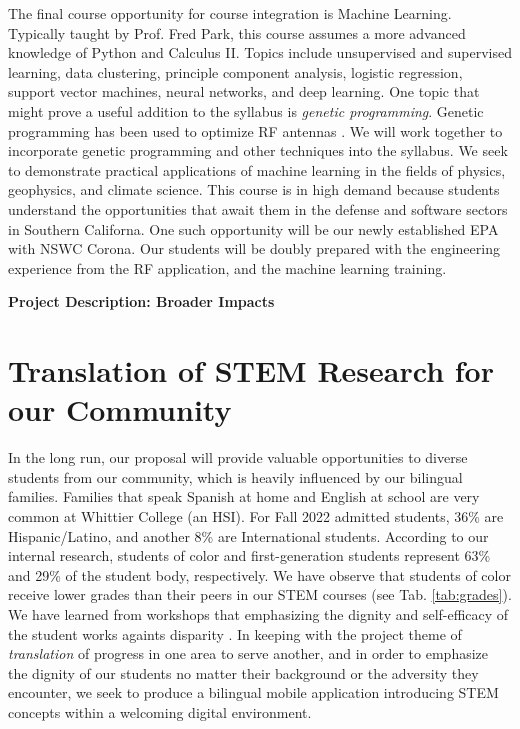 \documentclass[10pt]{amsart}
\theoremstyle{definition}
\numberwithin{equation}{section}
\begin{document}
The final course opportunity for course integration is Machine Learning.  Typically taught by Prof. Fred Park, this course assumes a more advanced knowledge of Python and Calculus II.  Topics include unsupervised and supervised learning, data clustering, principle component analysis, logistic regression, support vector machines, neural networks, and deep learning.  One topic that might prove a useful addition to the syllabus is \textit{genetic programming}.  Genetic programming has been used to optimize RF antennas \cite{2016MsT.........58S,genetic}.  We will work together to incorporate genetic programming and other techniques into the syllabus.  We seek to demonstrate practical applications of machine learning in the fields of physics, geophysics, and climate science.  This course is in high demand because students understand the opportunities that await them in the defense and software sectors in Southern Californa.  One such opportunity will be our newly established EPA with NSWC Corona.  Our students will be doubly prepared with the engineering experience from the RF application, and the machine learning training.

\linespacing
\centerline{\bf \Large Project Description: Broader Impacts}
\linespacing

\section{Translation of STEM Research for our Community}
\label{sec:broad}

In the long run, our proposal will provide valuable opportunities to diverse students from our community, which is heavily influenced by our bilingual families.  Families that speak Spanish at home and English at school are very common at Whittier College (an HSI).  For Fall 2022 admitted students, 36\% are Hispanic/Latino, and another 8\% are International students.  According to our internal research, students of color and first-generation students represent 63\% and 29\% of the student body, respectively.  We have observe that students of color receive lower grades than their peers in our STEM courses (see Tab. \ref{tab:grades}).  We have learned from workshops that emphasizing the dignity and self-efficacy of the student works againts disparity \cite{cottrell1,cottrell2}.  In keeping with the project theme of \textit{translation} of progress in one area to serve another, and in order to emphasize the dignity of our students no matter their background or the adversity they encounter, we seek to produce a bilingual mobile application introducing STEM concepts within a welcoming digital environment. 
\end{document}
